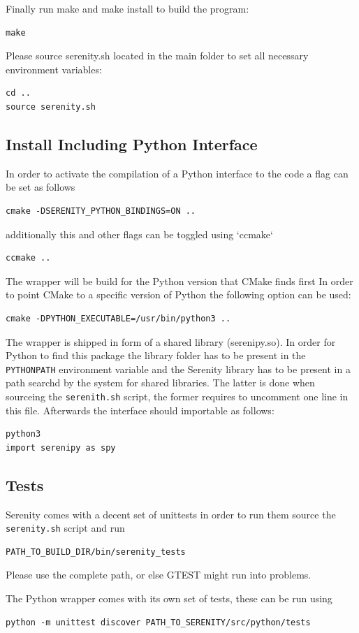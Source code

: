 \documentclass[bibliography=totocnumbered,a4paper,10pt]{scrartcl}
\begin{document}
Finally run make and make install to build the program:
\begin{lstlisting}
make         
\end{lstlisting}
Please source serenity.sh located in the main folder to set all necessary environment 
variables:
\begin{lstlisting}
cd ..  
source serenity.sh
\end{lstlisting}
\subsection{Install Including Python Interface}
In order to activate the compilation of a Python interface to the code
a flag can be set as follows
\begin{lstlisting}
cmake -DSERENITY_PYTHON_BINDINGS=ON ..
\end{lstlisting}
additionally this and other flags can be toggled using `ccmake`
\begin{lstlisting}
ccmake ..
\end{lstlisting}
The wrapper will be build for the Python version that CMake finds first
In order to point CMake to a specific version of Python the following 
option can be used:
\begin{lstlisting}
cmake -DPYTHON_EXECUTABLE=/usr/bin/python3 ..
\end{lstlisting}
The wrapper is shipped in form of a shared library (serenipy.so).
In order for Python to find this package the library folder has to be present 
in the \texttt{PYTHONPATH} environment variable and the Serenity library has to be 
present in a path searchd by the system for shared libraries.
The latter is done when sourceing the \texttt{serenith.sh} script, the former requires 
to uncomment one line in this file.
Afterwards the interface should importable as follows:
\begin{lstlisting}
python3
import serenipy as spy  
\end{lstlisting}
\subsection{Tests}
Serenity comes with a decent set of unittests in order to run them source 
the \texttt{serenity.sh} script and run
\begin{lstlisting}
PATH_TO_BUILD_DIR/bin/serenity_tests
\end{lstlisting}
Please use the complete path, or else GTEST might run into problems.  
  
The Python wrapper comes with its own set of tests, these can be run using
\begin{lstlisting}
python -m unittest discover PATH_TO_SERENITY/src/python/tests
\end{lstlisting}
\end{document}
